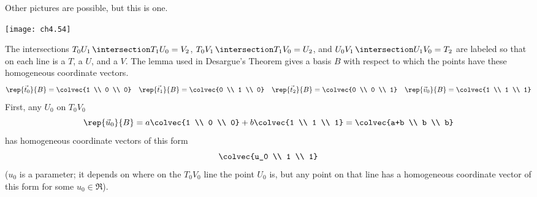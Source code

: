 \begin{ans}{7}
      \begin{exparts}
        \partsitem Other pictures are possible, but this is one.
          \begin{center}
            \texttt{[image: ch4.54]}
          \end{center}
          The intersections
          $
              T_0U_1\,\intersection T_1U_0=V_2
          $, $
              T_0V_1\,\intersection T_1V_0=U_2
          $, and $
              U_0V_1\,\intersection U_1V_0=T_2
          $
          are labeled so that on each line is a $T$, a $U$, and a $V$.
        \partsitem The lemma used in Desargue's Theorem gives a
          basis $B$ with respect to which the points have these
          homogeneous coordinate vectors.
          \begin{equation*}
            \rep{\vec{t}_0}{B}=\colvec{1 \\ 0 \\ 0}
            \quad
            \rep{\vec{t}_1}{B}=\colvec{0 \\ 1 \\ 0}
            \quad
            \rep{\vec{t}_2}{B}=\colvec{0 \\ 0 \\ 1}
            \quad
            \rep{\vec{v}_0}{B}=\colvec{1 \\ 1 \\ 1}
          \end{equation*}
        \partsitem
          First, any $U_0$ on $T_0V_0$
          \begin{equation*}
            \rep{\vec{u}_0}{B}=a\colvec{1 \\ 0 \\ 0}
                               +b\colvec{1 \\ 1 \\ 1}
                              =\colvec{a+b \\ b \\ b}
          \end{equation*}
          has homogeneous coordinate vectors of this form
          \begin{equation*}
            \colvec{u_0 \\ 1 \\ 1}
          \end{equation*}
          ($u_0$ is a parameter; it depends on where on the $T_0V_0$ line
          the point $U_0$ is, but any point on that line has
          a homogeneous coordinate vector of this form for some $u_0\in\Re$).

\end{exparts}
\end{ans}
